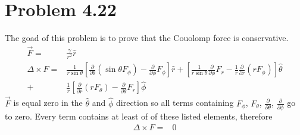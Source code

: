 \documentclass[12pt, a4paper]{article}
\begin{document}
\section*{Problem 4.22}
The goad of this problem is to prove that the Couolomp force  is conservative.
\begin{align*}
\vec{F} =& \frac{\gamma}{r^2}\hat{r}
\\
\Delta \times F  =& 
\frac{1}{r\sin\theta}\left[\frac{\partial}{\partial\theta}(\sin\theta F_\phi)-\frac{\partial}{\partial\phi}F_\phi\right]\hat{r} 
+\left[\frac{1}{r\sin\theta}\frac{\partial}{\partial\phi}F_r-\frac{1}{r}\frac{\partial}{\partial r}(rF_\phi)\right]\hat{\theta} 
\\
+& \frac{1}{r}\left[\frac{\partial}{\partial r}(rF_\theta)-\frac{\partial}{\partial\theta}F_r\right]\hat{\phi}
\end{align*}
$\vec{F}$ is equal zero in the $\hat{\theta}$ and $\hat{\phi}$ direction so all terms containing $F_\phi$, $F_\theta$, $\frac{\partial}{\partial \theta}$, $\frac{\partial}{\partial\phi}$ go to zero. Every term contains at least of of these listed elements, therefore
\begin{align*}
\Delta \times F =& 0
\end{align*} 
\end{document}
